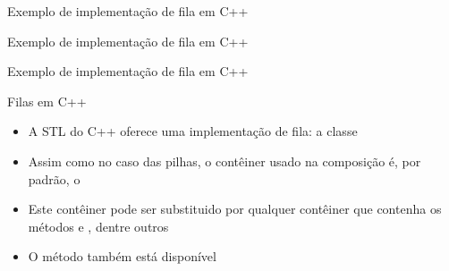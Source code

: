 \begin{frame}[fragile]{Exemplo de implementação de fila em C++}
\end{frame}

\begin{frame}[fragile]{Exemplo de implementação de fila em C++}
\end{frame}

\begin{frame}[fragile]{Exemplo de implementação de fila em C++}
\end{frame}

\begin{frame}[fragile]{Filas em C++}

    \begin{itemize}
        \item A STL do C++ oferece uma implementação de fila: a classe 

        \item Assim como no caso das pilhas, o contêiner usado na composição é, por padrão,
            o 

        \item Este contêiner pode ser substituido por qualquer contêiner que contenha os métodos
             e , dentre outros

        \item O método  também está disponível
    \end{itemize}

\end{frame}
